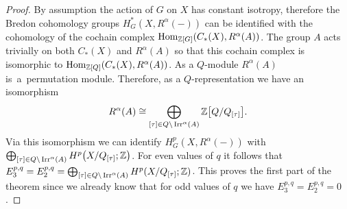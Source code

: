 \documentclass[10pt,a4paper]{amsart}
\def\Z{\mathbb{Z}}
\DeclareMathOperator{\Hom}{\textup{Hom}}
\DeclareMathOperator{\Irr}{\textup{Irr}}
\theoremstyle{definition}
\numberwithin{equation}{section}
\begin{document}
\begin{proof}
By assumption the action of $G$ on $X$ has constant isotropy, therefore the Bredon coho\-mo\-logy groups
$H^*_G(X, R^{\alpha}(-))$ can be identified with the cohomology
of the cochain comp\-lex $\Hom_{\Z[G]}(C_{*}(X),R^{\alpha}(A))$. The group $A$ acts trivially on both
$C_{*}(X)$ and $R^{\alpha}(A)$ so that this cochain comp\-lex is isomorphic to
$\Hom_{\Z[Q]}(C_{*}(X),R^{\alpha}(A))$. As a $Q$-module $R^{\alpha}(A)$ is~a~per\-mutation module.
Therefore, as a $Q$-representation we have
an isomorphism
\begin{gather*}
R^{\alpha}(A)\cong \bigoplus_{[\tau]\in Q \backslash\Irr^{\alpha}(A)} \Z\big[Q/Q_{[\tau]}\big].
\end{gather*}
Via this isomorphism we can identify $H_G^p(X,R^{\alpha}(-))$ with
$\bigoplus_{[\tau]\in Q \backslash\Irr^{\alpha}(A)}H^{p}\big(X/Q_{[\tau]};\Z\big)$. For even values of $q$
it follows that $E_{3}^{p,q}=E_{2}^{p,q}=\bigoplus_{[\tau]\in Q \backslash \Irr^{\alpha}(A)}H^{p}(X/Q_{[\tau]};\Z)$.
This proves the first part of the theorem since we already know that for odd values of $q$ we have
$E_{3}^{p,q}=E_{2}^{p,q}=0$.


\end{proof}
\end{document}

